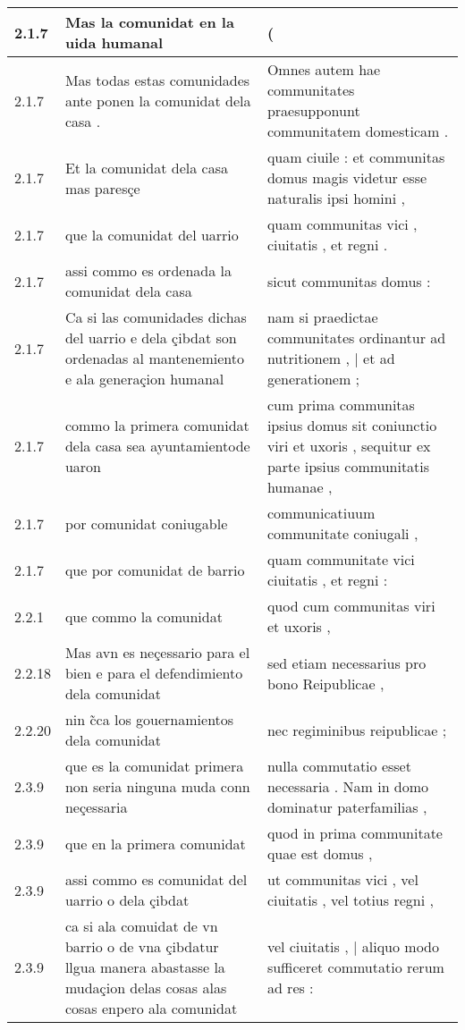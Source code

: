 \begin{tabular}{|p{1cm}|p{6.5cm}|p{6.5cm}|}
2.1.7 & Mas la comunidat en la uida humanal & ( \\\hline
2.1.7 & Mas todas estas comunidades ante ponen la comunidat dela casa . & Omnes autem hae communitates praesupponunt communitatem domesticam . \\\hline
2.1.7 & Et la comunidat dela casa mas paresçe & quam ciuile : et communitas domus magis videtur esse naturalis ipsi homini , \\\hline
2.1.7 & que la comunidat del uarrio & quam communitas vici , ciuitatis , et regni . \\\hline
2.1.7 & assi commo es ordenada la comunidat dela casa & sicut communitas domus : \\\hline
2.1.7 & Ca si las comunidades dichas del uarrio e dela çibdat son ordenadas al mantenemiento e ala generaçion humanal & nam si praedictae communitates ordinantur ad nutritionem , | et ad generationem ; \\\hline
2.1.7 & commo la primera comunidat dela casa sea ayuntamientode uaron & cum prima communitas ipsius domus sit coniunctio viri et uxoris , sequitur ex parte ipsius communitatis humanae , \\\hline
2.1.7 & por comunidat coniugable & communicatiuum communitate coniugali , \\\hline
2.1.7 & que por comunidat de barrio & quam communitate vici ciuitatis , et regni : \\\hline
2.2.1 & que commo la comunidat & quod cum communitas viri et uxoris , \\\hline
2.2.18 & Mas avn es neçessario para el bien e para el defendimiento dela comunidat & sed etiam necessarius pro bono Reipublicae , \\\hline
2.2.20 & nin c̃ca los gouernamientos dela comunidat & nec regiminibus reipublicae ; \\\hline
2.3.9 & que es la comunidat primera non seria ninguna muda conn neçessaria & nulla commutatio esset necessaria . Nam in domo dominatur paterfamilias , \\\hline
2.3.9 & que en la primera comunidat & quod in prima communitate quae est domus , \\\hline
2.3.9 & assi commo es comunidat del uarrio o dela çibdat & ut communitas vici , vel ciuitatis , vel totius regni , \\\hline
2.3.9 & ca si ala comuidat de vn barrio o de vna çibdatur llgua manera abastasse la mudaçion delas cosas alas cosas enpero ala comunidat & vel ciuitatis , | aliquo modo sufficeret commutatio rerum ad res : \\\hline

\end{tabular}
